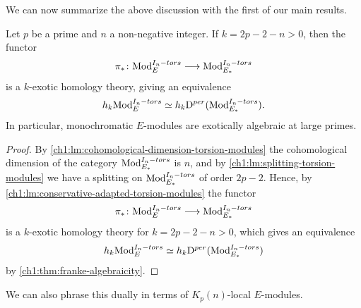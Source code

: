 
We can now summarize the above discussion with the first of our main results. 

\begin{theorem}
    \label{ch1:thm:main-modules}
    Let $p$ be a prime and $n$ a non-negative integer. If $k=2p-2-n>0$, then the functor 
    $$\pi_*\colon \mathrm{Mod}_{E}^{I_n-tors}\longrightarrow\mathrm{Mod}_{E_*}^{I_n-tors}$$
    is a $k$-exotic homology theory, giving an equivalence 
    $$h_k \mathrm{Mod}_{E}^{I_n-tors} \simeq h_k \mathrm{D}^{per}(\mathrm{Mod}_{E_*}^{I_n-tors}).$$
    In particular, monochromatic $E$-modules are exotically algebraic at large primes. 
\end{theorem}
\begin{proof}
    By \cref{ch1:lm:cohomological-dimension-torsion-modules} the cohomological dimension of the category $\mathrm{Mod}_{E_*}^{I_n-tors}$ is $n$, and by \cref{ch1:lm:splitting-torsion-modules} we have a splitting on $\mathrm{Mod}_{E_*}^{I_n-tors}$ of order $2p-2$. Hence, by \cref{ch1:lm:conservative-adapted-torsion-modules} the functor $$\pi_*\colon \mathrm{Mod}_{E}^{I_n-tors} \longrightarrow \mathrm{Mod}_{E_*}^{I_n-tors}$$
    is a $k$-exotic homology theory for $k=2p-2-n>0$, which gives an equivalence 
    $$h_k \mathrm{Mod}_{E}^{I_n-tors} \simeq h_k \mathrm{D}^{per}(\mathrm{Mod}_{E_*}^{I_n-tors})$$
    by \cref{ch1:thm:franke-algebraicity}.
\end{proof}

We can also phrase this dually in terms of $K_p(n)$-local $E$-modules. 

